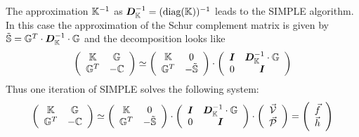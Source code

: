The approximation ${\mathbb{K}}^{-1}$ as ${\bm D}_{\mathbb{K}}^{-1} = (\text{diag}({\mathbb{K}}))^{-1}$ leads to the 
SIMPLE algorithm. In this case the approximation of the Schur complement matrix is given by
$\tilde{{\mathbb{S}}} = {\mathbb{G}}^T\cdot  {\bm D}_{\mathbb{K}}^{-1} \cdot {\mathbb{G}}$  and the decomposition looks like
\[
\left(
\begin{array}{cc}
{\mathbb{K}} & {\mathbb{G}} \\ {\mathbb{G}}^T & -{\mathbb{C}} 
\end{array}
\right)
\simeq
\left(
\begin{array}{cc}
{\mathbb{K}} & 0 \\ 
{\mathbb{G}}^T & -\tilde{{\mathbb{S}}}
\end{array}
\right)
\cdot
\left(
\begin{array}{cc}
{\bm I} & {\bm D}_{\mathbb{K}}^{-1} \cdot {\mathbb{G}} \\
0 & {\bm I} 
\end{array}
\right)
\]
Thus one iteration of SIMPLE solves the following system:
\[
\left(
\begin{array}{cc}
{\mathbb{K}} & {\mathbb{G}} \\ {\mathbb{G}}^T & -{\mathbb{C}} 
\end{array}
\right)
\simeq
\left(
\begin{array}{cc}
{\mathbb{K}} & 0 \\ 
{\mathbb{G}}^T & -\tilde{{\mathbb{S}}}
\end{array}
\right)
\cdot
\left(
\begin{array}{cc}
{\bm I} & {\bm D}_{\mathbb{K}}^{-1} \cdot {\mathbb{G}} \\
0 & {\bm I} 
\end{array}
\right)
\cdot
\left(
\begin{array}{c}
\vec{\cal V} \\ \vec{\cal P}
\end{array}
\right)
=
\left(
\begin{array}{c}
\vec{f} \\ \vec{h}
\end{array}
\right)
\]

